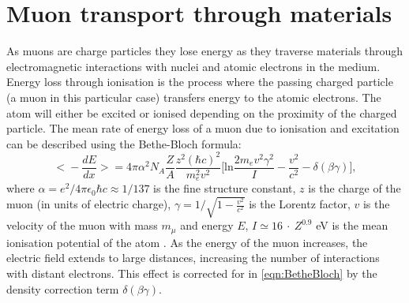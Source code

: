 \section{Muon transport through materials}\label{sec:Muons/MuonTransport}
As muons are charge particles they lose energy as they traverse materials through electromagnetic interactions with nuclei and atomic electrons in the medium. Energy loss through ionisation is the process where the passing charged particle (a muon in this particular case) transfers energy to the atomic electrons. The atom will either be excited or ionised depending on the proximity of the charged particle. The mean rate of energy loss of a muon due to ionisation and excitation can be described using the Bethe-Bloch formula:
\begin{equation}\label{eqn:BetheBloch}
    \Biggl<-\frac{dE}{dx}\Biggl>=4\pi\alpha^2N_A\frac{Z}{A}\frac{z^2(\hbar c)^2}{m_e^2v^2}\Biggl[\text{ln}\frac{2m_ev^2\gamma^2}{I}-\frac{v^2}{c^2}-\delta(\beta\gamma)\Biggl],
\end{equation}
where $\alpha=e^2/4\pi\epsilon_0\hbar c\approx1/137$ is the fine structure constant, $z$ is the charge of the muon (in units of electric charge), $\gamma=1/\sqrt{1-\frac{v^2}{c^2}}$ is the Lorentz factor, $v$ is the velocity of the muon with mass $m_\mu$ and energy $E$, $I\simeq16\:\cdot\:Z^{0.9}$ eV is the mean ionisation potential of the atom \cite{GROOM2001183}. As the energy of the muon increases, the electric field extends to large distances, increasing the number of interactions with distant electrons. This effect is corrected for in \autoref{eqn:BetheBloch} by the density correction term $\delta(\beta\gamma)$.

